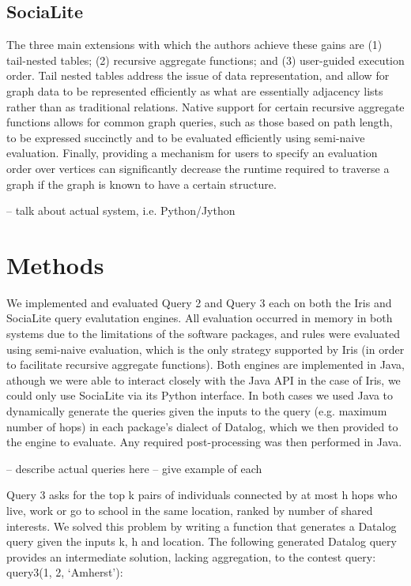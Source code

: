 \documentclass{article}
\begin{document}
\begin{multicols}{2}
\subsection{SociaLite}

The three main extensions with which the authors achieve these gains are (1) tail-nested tables; (2) recursive aggregate functions; and (3) user-guided execution order. Tail nested tables address the issue of data representation, and allow for graph data to be represented efficiently as what are essentially adjacency lists rather than as traditional relations. Native support for certain recursive aggregate functions allows for common graph queries, such as those based on path length, to be expressed succinctly and to be evaluated efficiently using semi-naive evaluation. Finally, providing a mechanism for users to specify an evaluation order over vertices can significantly decrease the runtime required to traverse a graph if the graph is known to have a certain structure.

-- talk about actual system, i.e. Python/Jython

\section{Methods}

We implemented and evaluated Query 2 and Query 3 each on both the Iris and SociaLite query evalutation engines. All evaluation occurred in memory in both systems due to the limitations of the software packages, and rules were evaluated using semi-naive evaluation, which is the only strategy supported by Iris (in order to facilitate recursive aggregate functions). Both engines are implemented in Java, athough we were able to interact closely with the Java API in the case of Iris, we could only use SociaLite via its Python interface. In both cases we used Java to dynamically generate the queries given the inputs to the query (e.g. maximum number of hops) in each package's dialect of Datalog, which we then provided to the engine to evaluate. Any required post-processing was then performed in Java.

-- describe actual queries here
-- give example of each

Query 3 asks for the top k pairs of individuals connected by at most h hops who live, work or go to school in the same location, ranked by number of shared interests. We solved this problem by writing a function that generates a Datalog query given the inputs k, h and location. The following generated Datalog query provides an intermediate solution, lacking aggregation, to the contest query: query3(1, 2, ‘Amherst’):


\end{multicols}
\end{document}
